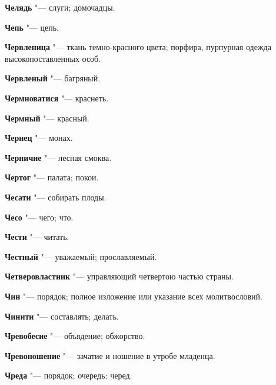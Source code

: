 \begin{mymulticols}{2}
\noindent\textbf{Челядь} "--- слуги; домочадцы. 




\noindent\textbf{Чепь} "--- цепь. 




\noindent\textbf{Червленица} "--- ткань темно-красного цвета; порфира, пурпурная одежда высокопоставленных особ. 




\noindent\textbf{Червленый} "--- багряный. 




\noindent\textbf{Чермноватися} "--- краснеть. 




\noindent\textbf{Чермный} "--- красный. 




\noindent\textbf{Чернец} "--- монах. 




\noindent\textbf{Черничие} "--- лесная смоква. 




\noindent\textbf{Чертог} "--- палата; покои. 




\noindent\textbf{Чесати} "--- собирать плоды. 




\noindent\textbf{Чесо} "--- чего; что. 




\noindent\textbf{Чести} "--- читать. 




\noindent\textbf{Честный} "--- уважаемый; прославляемый. 




\noindent\textbf{Четверовластник} "--- управляющий четвертою частью страны. 




\noindent\textbf{Чин} "--- порядок; полное изложение или указание всех молитвословий. 




\noindent\textbf{Чинити} "--- составлять; делать. 




\noindent\textbf{Чревобесие} "--- объядение; обжорство. 




\noindent\textbf{Чревоношение} "--- зачатие и ношение в утробе младенца. 




\noindent\textbf{Чреда} "--- порядок; очередь; черед. 





\end{mymulticols}
